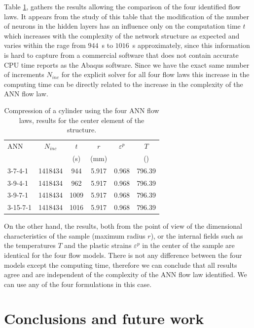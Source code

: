 \documentclass[algorithms,article,submit,pdftex,moreauthors]{Definitions/mdpi}
\begin{document}
Table \ref{tab:SimuResults}, gathers the results allowing the comparison of the four identified flow laws.
It appears from the study of this table that the modification of the number of neurons in the hidden layers has an influence only on the computation time $t$ which increases with the complexity of the network structure as expected and varies within the rage from $944$~s to $1016$~s approximately, since this information is hard to capture from a commercial software that does not contain accurate CPU time reports as the Abaqus software.
Since we have the exact same number of increments $N_{inc}$ for the explicit solver for all four flow laws this increase in the computing time can be directly related to the increase in the complexity of the ANN flow law.
\begin{table}[h!]
\centering
\caption{Compression of a cylinder using the four ANN flow laws, results for the center element of the structure.}
\begin{tabular}{lccccc}
	\hline
	ANN      &  $N_{inc}$  & $t$  &  $r$   & $\varepsilon^p$ &    $T$     \\
	         &         & (s)  &  (mm)  &                 & (\celsius) \\ \hline
	3-7-4-1  & 1418434 & 944  & 5.917 &      0.968      &   796.39   \\
	3-9-4-1  & 1418434 & 962  & 5.917 &      0.968      &   796.39   \\
	3-9-7-1  & 1418434 & 1009 & 5.917 &      0.968      &   796.39   \\
	3-15-7-1 & 1418434 & 1016 & 5.917 &      0.968      &   796.39   \\ \hline
\end{tabular}
\label{tab:SimuResults}
\end{table}
On the other hand, the results, both from the point of view of the dimensional characteristics of the sample (maximum radius $r$), or the internal fields such as the temperatures $T$ and the plastic strains $\varepsilon^p$ in the center of the sample are identical for the four flow models.
There is not any difference between the four models except the computing time, therefore we can conclude that all results agree and are independent of the complexity of the ANN flow law identified.
We can use any of the four formulations in this case.

\section{Conclusions and future work}\label{sec:Conclusions}
\end{document}

